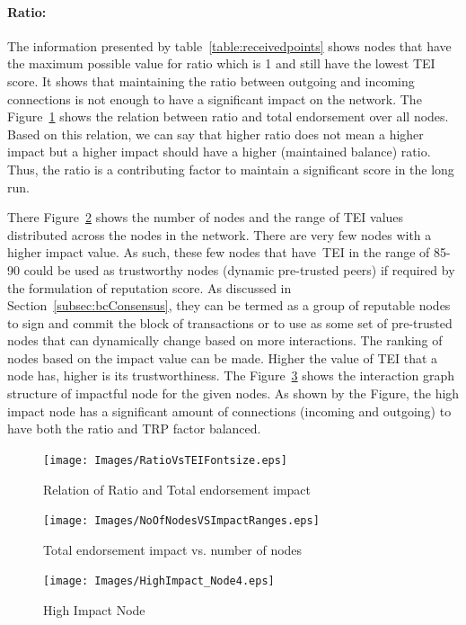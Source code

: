\paragraph{Ratio:} The information presented by
table~\ref{table:receivedpoints} shows nodes that have the maximum possible
value for ratio which is 1 and still have the lowest \ac{TEI} score. It shows
that maintaining the ratio between outgoing and incoming connections is not
enough to have a significant impact on the network. The
Figure~\ref{fig:ratioimpact} shows the relation between ratio and total
endorsement over all nodes. Based on this relation, we can say that higher
ratio does not mean a higher impact but a higher impact should have a higher
(maintained balance) ratio. Thus, the ratio is a contributing factor to
maintain a significant score in the long run. \par
There Figure~\ref{table:totalimpact} shows the number of nodes and the range of
\ac{TEI} values distributed across the nodes in the network. There are very few
nodes with a higher impact value. As such, these few nodes that have~\ac{TEI}
in the range of 85-90 could be used as trustworthy nodes (dynamic pre-trusted
peers) if required by the formulation of reputation score. As discussed in
Section~\ref{subsec:bcConsensus}, they can be termed as a group of reputable
nodes to sign and commit the block of transactions or to use as some set of
pre-trusted nodes that can dynamically change based on more interactions. The
ranking of nodes based on the impact value can be made. Higher the value of
\ac{TEI} that a node has, higher is its trustworthiness. The
Figure~\ref{fig:highImpactNode} shows the interaction graph structure of
impactful node for the given nodes. As shown by the Figure, the high impact
node has a significant amount of connections (incoming and outgoing) to have
both the ratio and \ac{TRP} factor balanced.
\begin{figure}
	\texttt{[image: Images/RatioVsTEIFontsize.eps]}
	\caption{Relation of Ratio and Total endorsement impact}
	\label{fig:ratioimpact}
\end{figure}
\begin{figure}
	\texttt{[image: Images/NoOfNodesVSImpactRanges.eps]}
	\caption{Total endorsement impact vs. number of nodes}
	\label{table:totalimpact}
\end{figure}
\begin{figure}
	\texttt{[image: Images/HighImpact\_Node4.eps]}
	\caption{High Impact Node}
	\label{fig:highImpactNode}
\end{figure}
